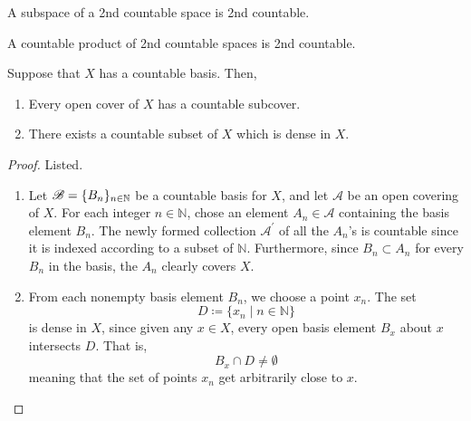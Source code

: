   \begin{theorem}[Subspace]
    A subspace of a 2nd countable space is 2nd countable. 
  \end{theorem}

  \begin{theorem}
    
  \end{theorem}

  \begin{theorem}
    A countable product of 2nd countable spaces is 2nd countable. 
  \end{theorem}

  \begin{theorem}
    Suppose that $X$ has a countable basis. Then, 
    \begin{enumerate}
      \item Every open cover of $X$ has a countable subcover. 
      \item There exists a countable subset of $X$ which is dense in $X$. 
    \end{enumerate}
  \end{theorem}
  \begin{proof}
    Listed. 
    \begin{enumerate}
      \item Let $\operatorname{\mathscr{B}} = \{B_n\}_{n \in \mathbb{N}}$ be a countable basis for $X$, and let $\mathscr{A}$ be an open covering of $X$. For each integer $n \in \mathbb{N}$, chose an element $A_n \in \mathscr{A}$ containing the basis element $B_n$. The newly formed collection $\mathscr{A}^\prime$ of all the $A_n$'s is countable since it is indexed according to a subset of $\mathbb{N}$. Furthermore, since $B_n \subset A_n$ for every $B_n$ in the basis, the $A_n$ clearly covers $X$. 

      \item From each nonempty basis element $B_n$, we choose a point $x_n$. The set 
      \begin{equation}
        D \coloneqq \{x_n \mid n \in \mathbb{N}\}
      \end{equation}
      is dense in $X$, since given any $x \in X$, every open basis element $B_x$ about $x$ intersects $D$. That is, 
      \begin{equation}
        B_x \cap D \neq \emptyset
      \end{equation}
      meaning that the set of points $x_n$ get arbitrarily close to $x$. 
    \end{enumerate}
  \end{proof}

